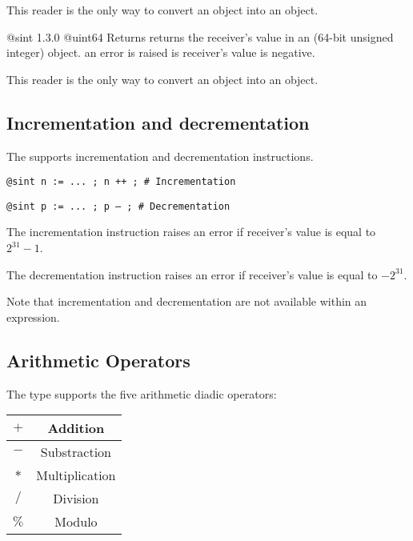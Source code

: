 This reader is the only way to convert an  object into an  object.




{@sint}
{1.3.0}
{@uint64}
{Returns returns the receiver's value in an  (64-bit unsigned integer) object.}
{an error is raised is receiver's value is negative.}

This reader is the only way to convert an  object into an  object.





\subsection{Incrementation and decrementation}

The  supports incrementation and decrementation instructions.

\texttt{@sint n := ... ; n ++ ; \# Incrementation}

\texttt{@sint p := ... ; p -- ; \# Decrementation}\newline

The incrementation instruction raises an error if receiver's value is equal to $2^{31}-1$.\newline

The decrementation instruction raises an error if receiver's value is equal to $-2^{31}$.\newline

Note that incrementation and decrementation are not available within an expression.




\subsection{Arithmetic Operators}

The  type supports the five arithmetic diadic operators:\newline

\begin{tabular}{|c|c|}
\hline
$+$ & Addition \\
\hline
$-$ & Substraction \\
\hline
$*$ & Multiplication \\
\hline
$/$ & Division \\
\hline
$\%$ & Modulo \\
\hline
\end{tabular}\newline

